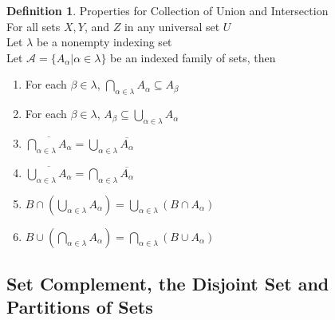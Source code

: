 \documentclass{book}
\theoremstyle{definition}
\newtheorem{definition}{Definition}[section]
\theoremstyle{remark}
\begin{document}
\begin{definition}
Properties for Collection of Union and Intersection \\

For all sets $X, Y$, and $Z$ in any universal set $U$ \\
Let $\lambda$ be a nonempty indexing set \\
Let $\mathcal{A} = \{ A_{\alpha} | \alpha \in \lambda \}$ be an indexed family of sets, then 
    
    \begin{enumerate}
        \item For each $\beta \in \lambda$, $\bigcap_{\alpha \in \lambda}{A_{\alpha}} \subseteq A_{\beta}$ 
        \item For each $\beta \in \lambda$, $A_{\beta} \subseteq \bigcup_{\alpha \in \lambda}{A_{\alpha}}$ 
        \item $\overline{\bigcap_{\alpha \in \lambda}{A_{\alpha}}} = \bigcup_{\alpha \in \lambda}{ \overline{A_{\alpha}}}$
        \item $\overline{\bigcup_{\alpha \in \lambda}{A_{\alpha}}} = \bigcap_{\alpha \in \lambda}{ \overline{A_{\alpha}}}$
        \item $B \cap \left (\bigcup_{\alpha \in \lambda}{A_{\alpha}} \right ) = \bigcup_{\alpha \in \lambda}{(B \cap A_{\alpha})}$
        \item $B \cup \left ( \bigcap_{\alpha \in \lambda}{A_{\alpha}} \right ) = \bigcap_{\alpha \in \lambda}{(B \cup A_{\alpha})}$
    \end{enumerate}
\end{definition}





\newpage
\subsection{Set Complement, the Disjoint Set and Partitions of Sets}
\end{document}
